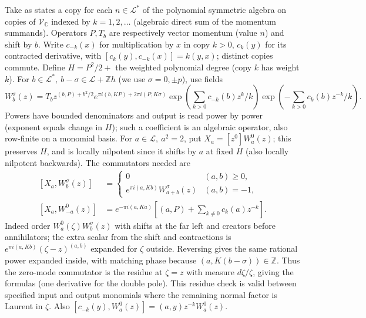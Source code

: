 Take as states a copy for each \(n\in\mathcal L^*\) of the polynomial symmetric algebra on copies of \(\mathcal V_{\mathbb C}\) indexed by \(k=1,2,\ldots\) (algebraic direct sum of the momentum summands). Operators \(P,T_b\) are respectively vector momentum (value \(n\)) and shift by \(b\). Write \(c_{-k}(x)\) for multiplication by \(x\) in copy \(k>0\), \(c_k(y)\) for its contracted derivative, with \([c_k(y),c_{-k}(x)]=k(y,x)\); distinct copies commute. Define \(H=P^2/2+\) the weighted polynomial degree (copy \(k\) has weight \(k\)). For \(b\in\mathcal L^*,\ b-\sigma\in\mathcal L+\mathbb Z h\) (we use \(\sigma=0,\pm p\)), use fields
\[
 W_b^\sigma(z)=T_b z^{(b,P)+b^2/2} e^{\pi i(b,KP)+2\pi i(P,K\sigma)}
       \exp\!\left(\sum_{k>0} c_{-k}(b)z^k/k\right)
       \exp\!\left(-\sum_{k>0} c_k(b)z^{-k}/k\right).
\]
Powers have bounded denominators and output is read power by power (exponent equals change in \(H\)); such a coefficient is an algebraic operator, also row-finite on a monomial basis. For \(a\in\mathcal L,\ a^2=2\), put \(X_a=[z^0]W_a^0(z)\); this preserves \(H\), and is locally nilpotent since it shifts by \(a\) at fixed \(H\) (also locally nilpotent backwards). The commutators needed are
\[
 \begin{aligned}
 [X_a,W_b^\sigma(z)]&=
 \begin{cases}0 &(a,b)\ge0,\\ e^{\pi i(a,K b)} W_{a+b}^\sigma(z)&(a,b)=-1,\end{cases}\\
 [X_a,W_{-a}^0(z)]&= e^{-\pi i(a,K a)}\left[(a,P)+\sum_{k\ne0}c_k(a)z^{-k}\right].
 \end{aligned}
\]
Indeed order \(W_a^0(\zeta) W_b^\sigma(z)\) with shifts at the far left and creators before annihilators; the extra scalar from the shift and contractions is \(e^{\pi i(a,K b)}(\zeta-z)^{(a,b)}\) expanded for \(\zeta\) outside. Reversing gives the same rational power expanded inside, with matching phase because \((a,K(b-\sigma))\in\mathbb Z\). Thus the zero-mode commutator is the residue at \(\zeta=z\) with measure \(d\zeta/\zeta\), giving the formulas (one derivative for the double pole). This residue check is valid between specified input and output monomials where the remaining normal factor is Laurent in \(\zeta\). Also \([c_{-k}(y),W_a^0(z)]=(a,y)z^{-k}W_a^0(z)\).

